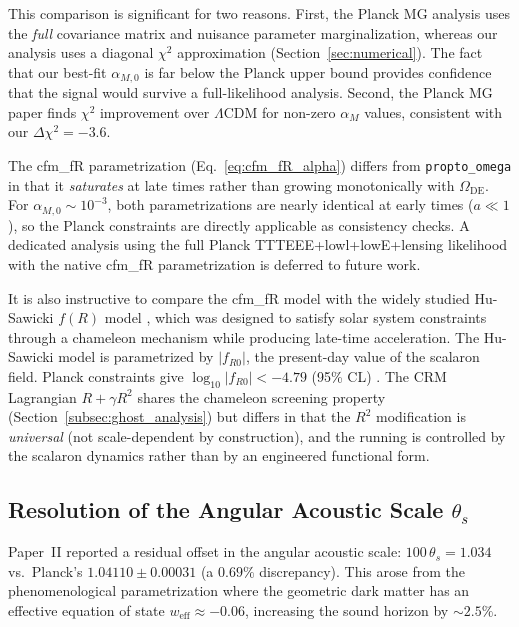\documentclass[aps,prd,twocolumn,superscriptaddress,nofootinbib]{revtex4-2}
\begin{document}
This comparison is significant for two reasons. First, the Planck MG analysis uses the \textit{full} covariance matrix and nuisance parameter marginalization, whereas our analysis uses a diagonal $\chi^2$ approximation (Section~\ref{sec:numerical}). The fact that our best-fit $\alpha_{M,0}$ is far below the Planck upper bound provides confidence that the signal would survive a full-likelihood analysis. Second, the Planck MG paper finds $\chi^2$ improvement over $\Lambda$CDM for non-zero $\alpha_M$ values, consistent with our $\Delta\chi^2 = -3.6$.

The cfm\_fR parametrization (Eq.~\ref{eq:cfm_fR_alpha}) differs from \texttt{propto\_omega} in that it \textit{saturates} at late times rather than growing monotonically with $\Omega_{\mathrm{DE}}$. For $\alpha_{M,0} \sim 10^{-3}$, both parametrizations are nearly identical at early times ($a \ll 1$), so the Planck constraints are directly applicable as consistency checks. A dedicated analysis using the full Planck TTTEEE+lowl+lowE+lensing likelihood with the native cfm\_fR parametrization is deferred to future work.

It is also instructive to compare the cfm\_fR model with the widely studied Hu-Sawicki $f(R)$ model \cite{HuSawicki2007}, which was designed to satisfy solar system constraints through a chameleon mechanism while producing late-time acceleration. The Hu-Sawicki model is parametrized by $|f_{R0}|$, the present-day value of the scalaron field. Planck constraints give $\log_{10}|f_{R0}| < -4.79$ (95\% CL) \cite{PlanckMG2016}. The CRM Lagrangian $R + \gamma R^2$ shares the chameleon screening property (Section~\ref{subsec:ghost_analysis}) but differs in that the $R^2$ modification is \textit{universal} (not scale-dependent by construction), and the running is controlled by the scalaron dynamics rather than by an engineered functional form.


\subsection{Resolution of the Angular Acoustic Scale $\theta_s$}
\label{subsec:theta_s}

Paper~II reported a residual offset in the angular acoustic scale: $100\,\theta_s = 1.034$ vs.\ Planck's $1.04110 \pm 0.00031$ (a $0.69\%$ discrepancy). This arose from the phenomenological parametrization where the geometric dark matter has an effective equation of state $w_{\mathrm{eff}} \approx -0.06$, increasing the sound horizon by $\sim 2.5\%$.
\end{document}

